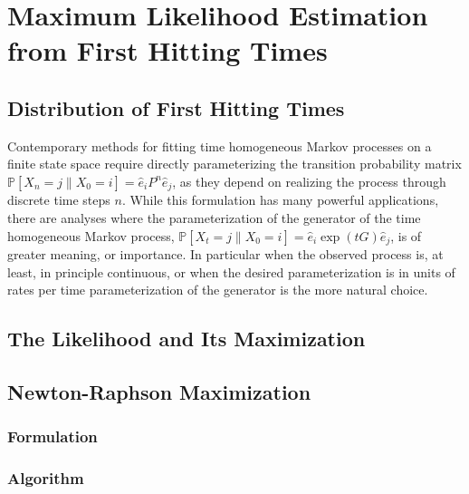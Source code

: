 \chapter{Maximum Likelihood Estimation from First Hitting Times}
\section{Distribution of First Hitting Times}
Contemporary methods for fitting time homogeneous Markov processes on a finite 
state space require directly parameterizing the transition probability matrix $\mathbb{P}\left[X_n = j \left\|X_0 = i \right.\right] = \hat{e}_i P^n \hat{e}_j$,
as they depend on realizing the process through discrete time steps $n$. While this 
formulation has many powerful applications, there are analyses where the parameterization of 
the generator of the time homogeneous Markov process, $\mathbb{P}\left[X_t = j \left\|X_0 = i \right.\right] = \hat{e}_i \exp\left({tG}\right) \hat{e}_j$, 
is of greater meaning, or importance. In particular when the observed process is, at least,
in principle continuous, or when the desired parameterization is in units of rates per time
parameterization of the generator is the more natural choice.

\section{The Likelihood and Its Maximization}
\section{Newton-Raphson Maximization}
\subsection{Formulation}
\subsection{Algorithm}
